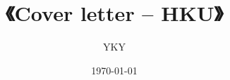 


\usepackage{color}
\usepackage{mathtools}
\usepackage{hyperref}

\usepackage[backend=biber,style=numeric]{biblatex}


\usepackage{graphicx} %
\usepackage{tikz-cd}
\usepackage{tikz}
\usepackage[export]{adjustbox}%
\usepackage{verbatim} %


\newcommand{\underdash}[1]{%
	\tikz[baseline=(toUnderline.base)]{
		\node[inner sep=1pt,outer sep=10pt] (toUnderline) {#1};
		\draw[dashed] ([yshift=-0pt]toUnderline.south west) -- ([yshift=-0pt]toUnderline.south east);
	}%
}%


\newcommand{\highlight}[1]{\colorbox{pink}{$\displaystyle #1$}}

\newcommand{\emp}[1]{{\color{violet}\textbf{#1}}}
\newcommand*\confoundFace{$\vcenter{\hbox{\texttt{[image: ../confounded-face.jpg]}}}$}

\newcommand{\witness}{\scalebox{0.6}{$\blacksquare$}}
\providecommand\Heytingarrow{\relbar\joinrel\mathrel{\vcenter{\hbox{\scalebox{0.75}{$\rhd$}}}}}



\title{\cc{\bfseries\color{blue}{\Huge《Cover letter -- HKU》}}
{{\Huge《Cover letter -- HKU》} }}
\author{YKY} %
\date{\today} %

\maketitle

